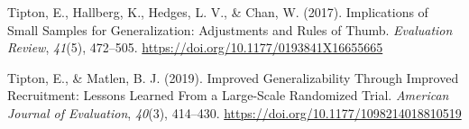 \documentclass[english,man,floatsintext]{apa6}
\begin{document}
\leavevmode\hypertarget{ref-tiptonImplicationsSmallSamples2017}{}%
Tipton, E., Hallberg, K., Hedges, L. V., \& Chan, W. (2017). Implications of Small Samples for Generalization: Adjustments and Rules of Thumb. \emph{Evaluation Review}, \emph{41}(5), 472--505. \url{https://doi.org/10.1177/0193841X16655665}

\leavevmode\hypertarget{ref-tiptonImprovedGeneralizabilityImproved2019}{}%
Tipton, E., \& Matlen, B. J. (2019). Improved Generalizability Through Improved Recruitment: Lessons Learned From a Large-Scale Randomized Trial. \emph{American Journal of Evaluation}, \emph{40}(3), 414--430. \url{https://doi.org/10.1177/1098214018810519}

\endgroup
\end{document}
